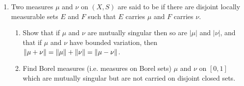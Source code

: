 \begin{enumerate}[label=\arabic*),ref=\arabic*]
\item Two measures $\mu$ and $\nu$ on $(X, S)$ are said to be  if there are disjoint locally measurable sets $E$ and $F$ such that $E$ carries $\mu$ and $F$ carries $\nu$.
\begin{enumerate}
\item Show that if $\mu$ and $\nu$ are mutually singular then so are $|\mu|$ and $|\nu|$, and that if $\mu$ and $\nu$ have bounded variation, then $\norm{\mu+\nu}=\norm{\mu}+\norm{\nu}=\norm{\mu-\nu}$.
\item Find Borel measures (i.e. measures on Borel sets) $\mu$ and $\nu$ on $[0,1]$ which are mutually singular but are not carried on disjoint closed sets.
\end{enumerate}
\end{enumerate}